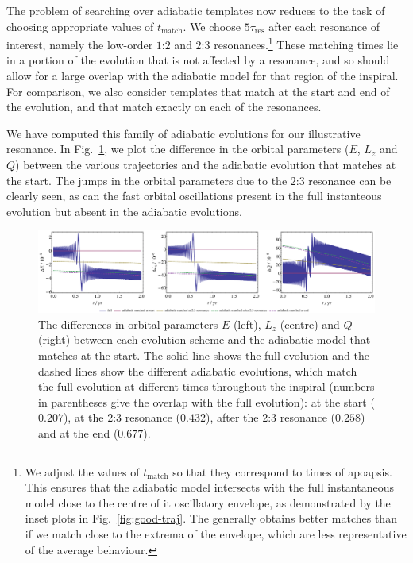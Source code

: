 \documentclass[aps,prd,amsfonts,amssymb,amsmath,nofootinbib,showpacs,superscriptaddress,twocolumn]{revtex4}
\newcommand{\figref}[1]{Fig.~\ref{fig:#1}}
\newcommand{\sub}[1]{\ensuremath{_\mathrm{#1}}}
\begin{document}
The problem of searching over adiabatic templates now reduces to the task of choosing appropriate values of $t_{\mathrm{match}}$. We choose $5\tau\sub{res}$ after each resonance of interest, namely the low-order $1$:$2$ and $2$:$3$ resonances.\footnote{We adjust the values of $t_{\mathrm{match}}$ so that they correspond to times of apoapsis. This ensures that the adiabatic model intersects with the full instantaneous model close to the centre of it oscillatory envelope, as demonstrated by the inset plots in \figref{good-traj}. The generally obtains better matches than if we match close to the extrema of the envelope, which are less representative of the average behaviour.} These matching times lie in a portion of the evolution that is not affected by a resonance, and so should allow for a large overlap with the adiabatic model for that region of the inspiral. For comparison, we also consider templates that match at the start and end of the evolution, and that match exactly on each of the resonances.


We have computed this family of adiabatic evolutions for our illustrative resonance. In \figref{res-diff-traj}, we plot the difference in the orbital parameters ($E$, $L_z$ and $Q$) between the various trajectories and the adiabatic evolution that matches at the start. The jumps in the orbital parameters due to the $2$:$3$ resonance can be clearly seen, as can the fast orbital oscillations present in the full instanteous evolution but absent in the adiabatic evolutions.

\begin{figure}
\centering
\includegraphics[width=\textwidth]{Fig_res_diff_traj}
\caption{\label{fig:res-diff-traj}The differences in orbital parameters $E$ (left), $L_z$ (centre) and $Q$ (right) between each evolution scheme and the adiabatic model that matches at the start. The solid line shows the full evolution and the dashed lines show the different adiabatic evolutions, which match the full evolution at different times throughout the inspiral (numbers in parentheses give the overlap with the full evolution): at the start ($0.207$), at the $2$:$3$ resonance ($0.432$), after the $2$:$3$ resonance ($0.258$) and at the end ($0.677$).}
\end{figure}
\end{document}
